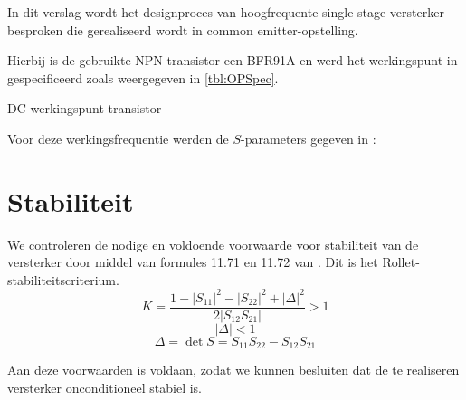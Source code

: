 
    In dit verslag wordt het designproces van hoogfrequente single-stage
    versterker besproken die gerealiseerd wordt in common emitter-opstelling.

    Hierbij is de gebruikte NPN-transistor een BFR91A en werd
    het werkingspunt in \cite{lesWendy} gespecificeerd zoals weergegeven in
    \autoref{tbl:OPSpec}.
      \begin{table}[h!]
        \begin{center}

        \caption{DC werkingspunt transistor}
        \label{tbl:OPSpec}
        
        \end{center}
      \end{table} 
    
    Voor deze werkingsfrequentie werden de $S$-parameters gegeven in \cite{lesWendy}:
    
    
\section{Stabiliteit}
  
    We controleren de nodige en voldoende voorwaarde voor stabiliteit van de versterker
    door middel van formules 11.71 en 11.72 van \cite{Pozar}.
    Dit is het Rollet-stabiliteitscriterium.
    \[
      K = \frac{1 - \left| S_{11} \right|^2 - \left| S_{22} \right|^2 + \left| \Delta \right|^2}{2 \left| S_{12}S_{21} \right|} > 1
    \]
    \[
      \left| \Delta \right| < 1
    \]
    \[
      \Delta = \det{S} = S_{11}S_{22} - S_{12}S_{21}
    \]
    
    Aan deze voorwaarden is voldaan, zodat we kunnen besluiten dat de te realiseren versterker onconditioneel stabiel is.
